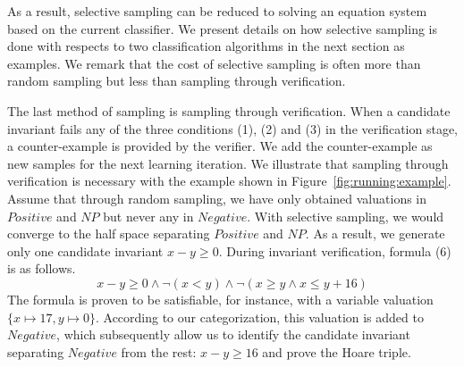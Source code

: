 As a result, selective sampling can be reduced to solving an equation system based on the current classifier. We present details on how selective sampling is done with respects to two classification algorithms in the next section as examples. We remark that the cost of selective sampling is often more than random sampling but less than sampling through verification.


The last method of sampling is sampling through verification. When a candidate invariant fails any of the three conditions (1), (2) and (3) in the verification stage,
a counter-example is provided by the verifier. We add the counter-example as new samples for the next learning iteration. We illustrate that sampling through verification is necessary with the example shown in Figure~\ref{fig:running:example}. Assume that through random sampling, we have only obtained valuations in $\mathit{Positive}$ and $\mathit{NP}$ but never any in $Negative$. With selective sampling, we would converge to the half space separating $\mathit{Positive}$ and $\mathit{NP}$. As a result, we generate only one candidate invariant $x - y \geq 0$. During invariant verification, formula (6) is as follows. \[
x - y \geq 0 \land \neg (x < y) \land \neg (x \geq y \land x \leq y + 16)
\]
The formula is proven to be satisfiable, for instance, with a variable valuation $\{x \mapsto 17, y \mapsto 0\}$. According to our categorization, this valuation is added to $\mathit{Negative}$, which subsequently allow us to identify the candidate invariant separating $\mathit{Negative}$ from the rest: $x - y \geq 16$ and prove the Hoare triple.


